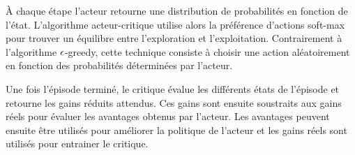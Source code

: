 À chaque étape l'acteur retourne une distribution de probabilités en fonction de l'état.
L'algorithme acteur-critique utilise alors la préférence d'actions soft-max pour trouver un équilibre entre l'exploration et l'exploitation. 
Contrairement à l'algorithme $\large\epsilon$-greedy, cette technique consiste à choisir une action aléatoirement en fonction des probabilités déterminées par l'acteur. \cite{BartoSutton}

Une fois l'épisode terminé, le critique évalue les différents états de l'épisode et retourne les gains réduits attendus.
Ces gains sont ensuite soustraits aux gains réels pour évaluer les avantages obtenus par l'acteur.
Les avantages peuvent ensuite être utilisés pour améliorer la politique de l'acteur et les gains réels sont utilisés pour 
entrainer le critique.
